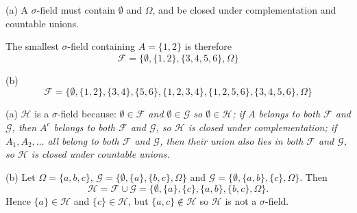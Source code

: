 \begin{Answer}{(a)}
A $\sigma$-field must contain $\emptyset$ and $\Omega$, and be closed under complementation and countable unions.
\par
The smallest $\sigma$-field containing $A=\{1,2\}$ is therefore
\[
\mathcal{F} = \{\emptyset, \{1,2\}, \{3,4,5,6\}, \Omega\}
\]
\end{Answer}
\begin{Answer}{(b)}
\[
\mathcal{F} = \{\emptyset, \{1,2\}, \{3,4\}, \{5,6\}, \{1,2,3,4\}, \{1,2,5,6\}, \{3,4,5,6\}, \Omega\}
\]
\end{Answer}
\begin{Answer}{(a)}
$\mathcal{H}$ is a $\sigma$-field because:
\bit
\it $\emptyset\in\mathcal{F}$ and $\emptyset\in\mathcal{G}$ so $\emptyset\in\mathcal{H}$;
\it if $A$ belongs to both $\mathcal{F}$ and $\mathcal{G}$, then $A^c$ belongs to both $\mathcal{F}$ and $\mathcal{G}$, so $\mathcal{H}$ is closed under complementation;
\it if $A_1,A_2,\ldots$ all belong to both $\mathcal{F}$ and $\mathcal{G}$, then their union also lies in both $\mathcal{F}$ and $\mathcal{G}$, so $\mathcal{H}$ is closed under countable unions.
\eit
 
\end{Answer}
\begin{Answer}{(b)}
Let $\Omega=\{a,b,c\}$, $\mathcal{G}=\big\{\emptyset,\{a\},\{b,c\},\Omega\big\}$ and $\mathcal{G}=\big\{\emptyset,\{a,b\},\{c\},\Omega\big\}$. Then
\[
\mathcal{H} = \mathcal{F}\cup\mathcal{G} = \big\{\emptyset,\{a\},\{c\},\{a,b\},\{b,c\},\Omega\big\}.
\]
Hence $\{a\}\in\mathcal{H}$ and $\{c\}\in\mathcal{H}$, but $\{a,c\}\notin\mathcal{H}$ so $\mathcal{H}$ is not a $\sigma$-field.
\end{Answer}
